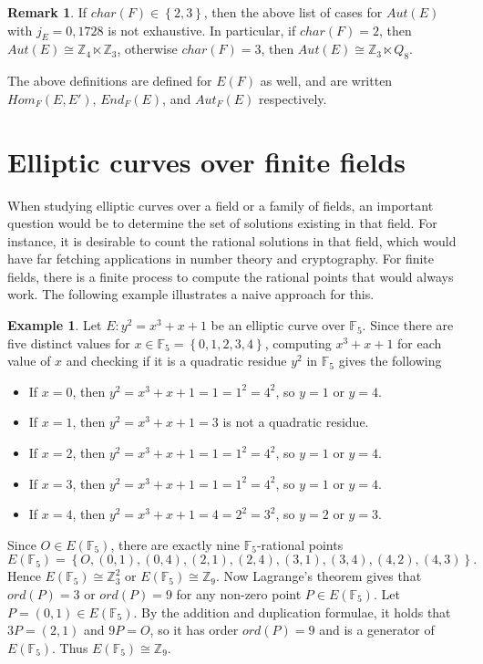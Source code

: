 \documentclass{article}
\newcommand{\F}{\mathbb{F}}
\newcommand{\Z}{\mathbb{Z}}
\newcommand{\rb}[1]{\left( #1 \right)}
\newcommand{\cb}[1]{\left\{ #1 \right\}}
\theoremstyle{definition}\newtheorem*{definition}{Definition}
\theoremstyle{definition}\newtheorem*{example}{Example}
\theoremstyle{definition}\newtheorem*{remark}{Remark}
\begin{document}
\begin{remark}
If $ char\rb{F} \in \cb{2, 3} $, then the above list of cases for $ Aut\rb{E} $ with $ j_E = 0, 1728 $ is not exhaustive. In particular, if $ char\rb{F} = 2 $, then $ Aut\rb{E} \cong \Z_4 \ltimes \Z_3 $, otherwise $ char\rb{F} = 3 $, then $ Aut\rb{E} \cong \Z_3 \ltimes Q_8 $.
\end{remark}

The above definitions are defined for $ E\rb{F} $ as well, and are written $ Hom_F\rb{E, E'} $, $ End_F\rb{E} $, and $ Aut_F\rb{E} $ respectively.

\pagebreak

\section{Elliptic curves over finite fields}

When studying elliptic curves over a field or a family of fields, an important question would be to determine the set of solutions existing in that field. For instance, it is desirable to count the rational solutions in that field, which would have far fetching applications in number theory and cryptography. For finite fields, there is a finite process to compute the rational points that would always work. The following example illustrates a naive approach for this.

\begin{example}
Let $ E : y^2 = x^3 + x + 1 $ be an elliptic curve over $ \F_5 $. Since there are five distinct values for $ x \in \F_5 = \cb{0, 1, 2, 3, 4} $, computing $ x^3 + x + 1 $ for each value of $ x $ and checking if it is a quadratic residue $ y^2 $ in $ \F_5 $ gives the following
\begin{itemize}
\item If $ x = 0 $, then $ y^2 = x^3 + x + 1 = 1 = 1^2 = 4^2 $, so $ y = 1 $ or $ y = 4 $.
\item If $ x = 1 $, then $ y^2 = x^3 + x + 1 = 3 $ is not a quadratic residue.
\item If $ x = 2 $, then $ y^2 = x^3 + x + 1 = 1 = 1^2 = 4^2 $, so $ y = 1 $ or $ y = 4 $.
\item If $ x = 3 $, then $ y^2 = x^3 + x + 1 = 1 = 1^2 = 4^2 $, so $ y = 1 $ or $ y = 4 $.
\item If $ x = 4 $, then $ y^2 = x^3 + x + 1 = 4 = 2^2 = 3^2 $, so $ y = 2 $ or $ y = 3 $.
\end{itemize}
Since $ O \in E\rb{\F_5} $, there are exactly nine $ \F_5 $-rational points
$$ E\rb{\F_5} = \cb{O, \rb{0, 1}, \rb{0, 4}, \rb{2, 1}, \rb{2, 4}, \rb{3, 1}, \rb{3, 4}, \rb{4, 2}, \rb{4, 3}}. $$
Hence $ E\rb{\F_5} \cong \Z_3^2 $ or $ E\rb{\F_5} \cong \Z_9 $. Now Lagrange's theorem gives that $ ord\rb{P} = 3 $ or $ ord\rb{P} = 9 $ for any non-zero point $ P \in E\rb{\F_5} $. Let $ P = \rb{0, 1} \in E\rb{\F_5} $. By the addition and duplication formulae, it holds that $ 3P = \rb{2, 1} $ and $ 9P = O $, so it has order $ ord\rb{P} = 9 $ and is a generator of $ E\rb{\F_5} $. Thus $ E\rb{\F_5} \cong \Z_9 $.
\end{example}
\end{document}
